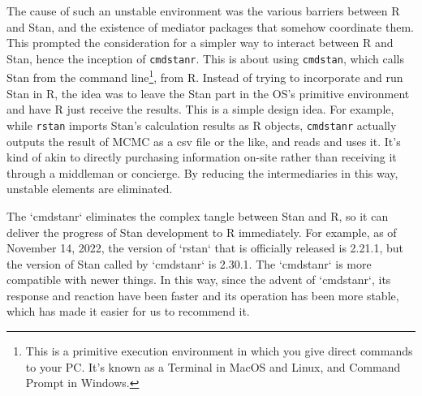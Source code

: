 \documentclass{ltjsbook}
\begin{document}
The cause of such an unstable environment was the various barriers between R and Stan, and the existence of mediator packages that somehow coordinate them. This prompted the consideration for a simpler way to interact between R and Stan, hence the inception of \verb|cmdstanr|. This is about using \verb|cmdstan|, which calls Stan from the command line\footnote{This is a primitive execution environment in which you give direct commands to your PC. It's known as a Terminal in MacOS and Linux, and Command Prompt in Windows.}, from R. Instead of trying to incorporate and run Stan in R, the idea was to leave the Stan part in the OS's primitive environment and have R just receive the results. This is a simple design idea. For example, while \verb|rstan| imports Stan's calculation results as R objects, \verb|cmdstanr| actually outputs the result of MCMC as a csv file or the like, and reads and uses it. It's kind of akin to directly purchasing information on-site rather than receiving it through a middleman or concierge. By reducing the intermediaries in this way, unstable elements are eliminated.

The `cmdstanr` eliminates the complex tangle between Stan and R, so it can deliver the progress of Stan development to R immediately. For example, as of November 14, 2022, the version of `rstan` that is officially released is 2.21.1, but the version of Stan called by `cmdstanr` is 2.30.1. The `cmdstanr` is more compatible with newer things. In this way, since the advent of `cmdstanr`, its response and reaction have been faster and its operation has been more stable, which has made it easier for us to recommend it.
\end{document}
